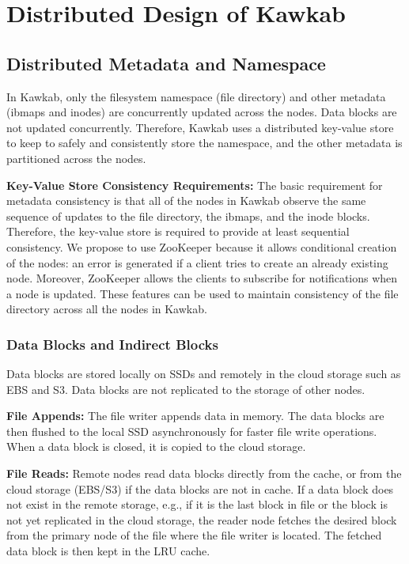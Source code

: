 \documentclass[]{article}
\newcommand{\subtopic}[1]{\vspace{1.5pt} \noindent \textbf{#1}}
\begin{document}
\section{Distributed Design of Kawkab}

\subsection{Distributed Metadata and Namespace}

In Kawkab, only the filesystem namespace (file directory) and other metadata
(ibmaps and inodes) are concurrently updated across the nodes. Data blocks are
not updated concurrently. Therefore, Kawkab uses a distributed key-value store
to keep to safely and consistently store the namespace, and the other metadata
is partitioned across the nodes.

\subtopic{Key-Value Store Consistency Requirements:} The basic requirement for
metadata consistency is that all of the nodes in Kawkab observe the same
sequence of updates to the file directory, the ibmaps, and the inode blocks.  
Therefore, the key-value store is required to provide at least sequential
consistency.
We propose to use ZooKeeper because it allows conditional creation of the
nodes: an error is generated if a client tries to create an already existing
node. Moreover, ZooKeeper allows the clients to subscribe for notifications
when a node is updated.  These features can be used to maintain consistency
of the file directory across all the nodes in Kawkab.


\subsubsection{Data Blocks and Indirect Blocks} Data blocks are stored locally
on SSDs and remotely in the cloud storage such as EBS and S3. Data blocks are
not replicated to the storage of other nodes.

\subtopic{File Appends:} The file writer appends data in memory. The data
blocks are then flushed to the local SSD asynchronously for faster file write
operations. When a data block is closed, it is copied to the cloud storage.

\subtopic{File Reads:} Remote nodes read data blocks directly from the cache,
or from the cloud storage (EBS/S3) if the data blocks are not in cache.  If a
data block does not exist in the remote storage, e.g., if it is the last block
in file or the block is not yet replicated in the cloud storage, the reader
node fetches the desired block from the primary node of the file where the file
writer is located. The fetched data block is then kept in the LRU cache.
\end{document}
